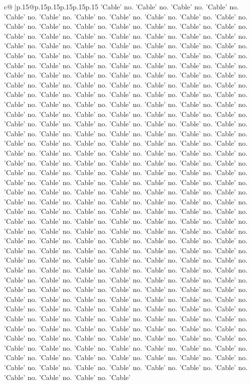 \documentclass{article}
\begin{document}
{\begin{supertabular}{c@{$\;$}|p{.15\linewidth}@{}p{.15\linewidth}p{.15\linewidth}p{.15\linewidth}p{.15\linewidth}p{.15\linewidth}}
{{{'Cable' no. 'Cable' no. 'Cable' no. 'Cable' no. 'Cable' no. 'Cable' no. 'Cable' no. 'Cable' no. 'Cable' no. 'Cable' no. 'Cable' no. 'Cable' no. 'Cable' no. 'Cable' no. 'Cable' no. 'Cable' no. 'Cable' no. 'Cable' no. 'Cable' no. 'Cable' no. 'Cable' no. 'Cable' no. 'Cable' no. 'Cable' no. 'Cable' no. 'Cable' no. 'Cable' no. 'Cable' no. 'Cable' no. 'Cable' no. 'Cable' no. 'Cable' no. 'Cable' no. 'Cable' no. 'Cable' no. 'Cable' no. 'Cable' no. 'Cable' no. 'Cable' no. 'Cable' no. 'Cable' no. 'Cable' no. 'Cable' no. 'Cable' no. 'Cable' no. 'Cable' no. 'Cable' no. 'Cable' no. 'Cable' no. 'Cable' no. 'Cable' no. 'Cable' no. 'Cable' no. 'Cable' no. 'Cable' no. 'Cable' no. 'Cable' no. 'Cable' no. 'Cable' no. 'Cable' no. 'Cable' no. 'Cable' no. 'Cable' no. 'Cable' no. 'Cable' no. 'Cable' no. 'Cable' no. 'Cable' no. 'Cable' no. 'Cable' no. 'Cable' no. 'Cable' no. 'Cable' no. 'Cable' no. 'Cable' no. 'Cable' no. 'Cable' no. 'Cable' no. 'Cable' no. 'Cable' no. 'Cable' no. 'Cable' no. 'Cable' no. 'Cable' no. 'Cable' no. 'Cable' no. 'Cable' no. 'Cable' no. 'Cable' no. 'Cable' no. 'Cable' no. 'Cable' no. 'Cable' no. 'Cable' no. 'Cable' no. 'Cable' no. 'Cable' no. 'Cable' no. 'Cable' no. 'Cable' no. 'Cable' no. 'Cable' no. 'Cable' no. 'Cable' no. 'Cable' no. 'Cable' no. 'Cable' no. 'Cable' no. 'Cable' no. 'Cable' no. 'Cable' no. 'Cable' no. 'Cable' no. 'Cable' no. 'Cable' no. 'Cable' no. 'Cable' no. 'Cable' no. 'Cable' no. 'Cable' no. 'Cable' no. 'Cable' no. 'Cable' no. 'Cable' no. 'Cable' no. 'Cable' no. 'Cable' no. 'Cable' no. 'Cable' no. 'Cable' no. 'Cable' no. 'Cable' no. 'Cable' no. 'Cable' no. 'Cable' no. 'Cable' no. 'Cable' no. 'Cable' no. 'Cable' no. 'Cable' no. 'Cable' no. 'Cable' no. 'Cable' no. 'Cable' no. 'Cable' no. 'Cable' no. 'Cable' no. 'Cable' no. 'Cable' no. 'Cable' no. 'Cable' no. 'Cable' no. 'Cable' no. 'Cable' no. 'Cable' no. 'Cable' no. 'Cable' no. 'Cable' no. 'Cable' no. 'Cable' no. 'Cable' no. 'Cable' no. 'Cable' no. 'Cable' no. 'Cable' no. 'Cable' no. 'Cable' no. 'Cable' no. 'Cable' no. 'Cable' no. 'Cable' no. 'Cable' no. 'Cable' no. 'Cable' no. 'Cable' no. 'Cable' no. 'Cable' no. 'Cable' no. 'Cable' no. 'Cable' no. 'Cable' no. 'Cable' no. 'Cable' no. 'Cable' no. 'Cable' no. 'Cable' no. 'Cable' no. 'Cable' no. 'Cable' no. 'Cable' no. 'Cable' no. 'Cable' no. 'Cable' no. 'Cable' no. 'Cable' no. 'Cable' no. 'Cable' no. 'Cable' no. 'Cable' no. 'Cable' no. 'Cable' no. 'Cable' no. 'Cable' no. 'Cable' no. 'Cable' no. 'Cable' no. 'Cable' no. 'Cable' no. 'Cable' no. 'Cable' no. 'Cable' no. 'Cable' no. 'Cable' no. 'Cable' no. 'Cable' no. 'Cable' no. 'Cable' no. 'Cable' no. 'Cable' no. 'Cable' no. 'Cable' no. 'Cable' no. 'Cable' no. 'Cable' no. 'Cable' no. 'Cable' no. 'Cable' no. 'Cable' no. 'Cable' no. 'Cable' no. 'Cable' no. 'Cable' no. 'Cable' no. 'Cable' no. 'Cable' no. 'Cable' no. 'Cable' no. 'Cable' no. 'Cable' no. 'Cable' no. 'Cable' no. 'Cable' no. 'Cable' no. 'Cable' no. 'Cable' no. 'Cable' no. 'Cable' no. 'Cable' no. 'Cable' no. 'Cable' no. 'Cable' no. 'Cable' no. 'Cable' no. 'Cable' no. 'Cable' no. 'Cable' no. 'Cable' no. 'Cable' no. 'Cable' no. 'Cable' no. 'Cable' no. 'Cable' no. 'Cable' no. 'Cable' no. 'Cable' no. 'Cable' no. 'Cable' }}}
\end{supertabular}}
\end{document}
